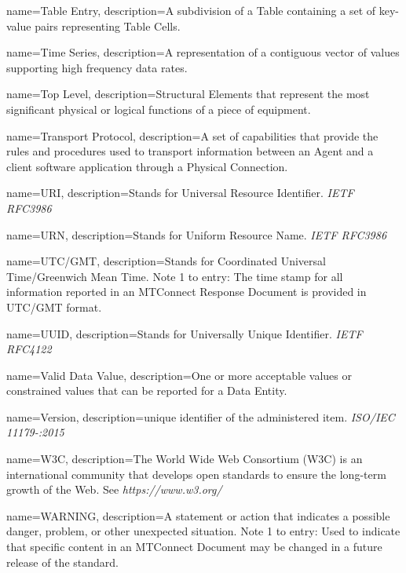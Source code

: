 {
    name={Table Entry},
	description={A subdivision of a \gls{Table} containing a set of \glspl{key-value pair} representing \glspl{Table Cell}.}
}

{
    name={Time Series},
	description={A  representation of a contiguous vector of values supporting high frequency data rates.}
}

{
    name={Top Level},
	description={\glspl{Structural Element} that represent the most significant physical or logical functions of a piece of equipment.}
}

{
    name={Transport Protocol},
	description={A set of capabilities that provide the rules and procedures used to transport information between an \gls{Agent} and a client software application through a \gls{Physical Connection}.}
}

{
    name={URI},
	description={Stands for Universal Resource Identifier. \textit{IETF RFC3986}
}
}

{
    name={URN},
	description={Stands for Uniform Resource Name. \textit{IETF RFC3986}
}
}

{
    name={UTC/GMT},
	description={Stands for Coordinated Universal Time/Greenwich Mean Time.  
Note 1 to entry: The \gls{time stamp} for all information reported in an \gls{MTConnect Response Document} is provided in UTC/GMT format.}
}

{
    name={UUID},
	description={Stands for Universally Unique Identifier.  \textit{IETF RFC4122}}
}

{
    name={Valid Data Value},
	description={One or more acceptable values or constrained values that can be reported for a \gls{Data Entity}.}
}

{
    name={Version},
	description={unique identifier of the administered item. \textit{ISO/IEC 11179-:2015}}
}

{
    name={W3C},
	description={The World Wide Web Consortium (W3C) is an international community that develops open standards to ensure the long-term growth of the Web. See \textit{https://www.w3.org/}}
}

{
    name={WARNING},
	description={A statement or action that indicates a possible danger, problem, or other unexpected situation.
Note 1 to entry: Used to indicate that specific content in an \gls{MTConnect Document} may be changed in a future release of the standard.}
}

